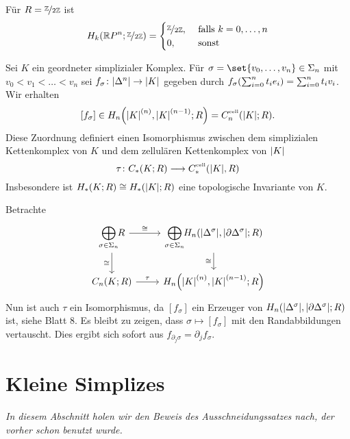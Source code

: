 Für $R=\nicefrac{\mathbb{Z}}{2 \mathbb{Z}}$ ist
\[
	H_k \enbrace*{\mathbb{R}P^n; \nicefrac{\mathbb{Z}}{2 \mathbb{Z}}} = \begin{cases}
		\nicefrac{\mathbb{Z}}{2 \mathbb{Z}}, &\text{ falls }k=0,\ldots ,n\\
		0 ,&\text{ sonst}
	\end{cases}
\]

\begin{satz}[{name=[{Isomorphie zwischen simplizialem und zellulärem Kettenkomplex}]}]
	Sei $K$ ein geordneter simplizialer Komplex. 
	Für $\sigma = \set{v_0, \ldots ,v_n} \in \Sigma_n$ mit $v_0 < v_1 < \ldots  < v_n$ sei $f_\sigma \colon \abs*{\Delta^n} \to \abs*{K}$ gegeben durch $f_\sigma \enbrace*{\sum_{i=0}^{n} t_i e_i} = \sum_{i=0}^{n} t_i v_i$. 
	Wir erhalten 
	\[
		[f_\sigma] \in H_n \enbrace*{\abs*{K}^{(n)}, \abs*{K}^{(n-1)};R} = C^\cell_n \enbrace*{\abs*{K};R}. 
	\]
	Diese Zuordnung definiert einen Isomorphismus zwischen dem simplizialen Kettenkomplex von $K$ und dem zellulären Kettenkomplex von $\abs*{K}$
	\[
		\tau \colon C_*(K;R) \longrightarrow C_*^\cell\enbrace*{\abs*{K},R } 
	\]
	Insbesondere ist $H_*(K;R) \cong H_*(\abs*{K};R)$ eine topologische Invariante von $K$.
\end{satz}
\begin{beweis}
	Betrachte 
	\[
		\begin{tikzcd}
			\smashoperator[r]{\bigoplus\limits_{\sigma \in \Sigma_n}} R \dar["\cong"'] \rar["\cong"]
			& \smashoperator[r]{\bigoplus\limits_{\sigma \in \Sigma_n}} H_n \enbrace*{\abs*{\Delta^\sigma}, \abs*{\partial \Delta^\sigma};R} \dar["\cong"'] \\
			C_n(K;R) \rar["\tau"] & H_n \enbrace*{\abs*{K}^{(n)}, \abs*{K}^{(n-1)};R} 
		\end{tikzcd}
	\]
	Nun ist auch $\tau$ ein Isomorphismus, da $[f_\sigma]$ ein Erzeuger von $H_n \enbrace*{\abs*{\Delta^\sigma}, \abs*{\partial \Delta^\sigma};R}$ ist, siehe Blatt 8. 
	Es bleibt zu zeigen, dass $\sigma \mapsto  [f_\sigma]$ mit den Randabbildungen vertauscht. 
	Dies ergibt sich sofort aus $f_{\partial_j \sigma} = \partial_j f_\sigma$.
\end{beweis}

\newpage

\section{Kleine Simplizes} %
\label{sec:13}

\emph{In diesem Abschnitt holen wir den Beweis des Ausschneidungssatzes nach, der vorher schon benutzt wurde.}

